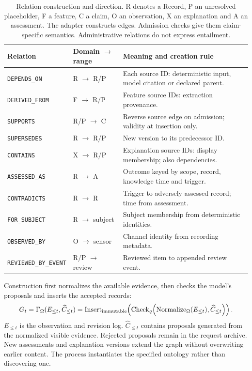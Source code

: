 \documentclass[runningheads]{llncs}
\begin{document}
\begin{table}[!htbp]
\caption{Relation construction and direction. R denotes a Record, P an unresolved
placeholder, F a feature, C a claim, O an observation, X an explanation and A an
assessment. The adapter constructs edges. Admission checks give them claim-specific
semantics. Administrative relations do not express entailment.}
\label{tab:relations}
\centering\footnotesize\setlength{\tabcolsep}{3pt}
\begin{tabularx}{\textwidth}{l l X}
\toprule Relation & Domain $\to$ range & Meaning and creation rule\\\midrule
\texttt{DEPENDS\_ON} & R $\to$ R/P & Each source ID: deterministic input, model citation or declared parent.\\
\texttt{DERIVED\_FROM} & F $\to$ R/P & Feature source IDs: extraction provenance.\\
\texttt{SUPPORTS} & R/P $\to$ C & Reverse source edge on admission; validity at insertion only.\\
\texttt{SUPERSEDES} & R $\to$ R/P & New version to its predecessor ID.\\
\texttt{CONTAINS} & X $\to$ R/P & Explanation source IDs: display membership; also dependencies.\\
\texttt{ASSESSED\_AS} & R $\to$ A & Outcome keyed by scope, record, knowledge time and trigger.\\
\texttt{CONTRADICTS} & R $\to$ R & Trigger to adversely assessed record; time from assessment.\\
\texttt{FOR\_SUBJECT} & R $\to$ subject & Subject membership from deterministic identities.\\
\texttt{OBSERVED\_BY} & O $\to$ sensor & Channel identity from recording metadata.\\
\texttt{REVIEWED\_BY\_EVENT} & R/P $\to$ review & Reviewed item to appended review event.\\
\bottomrule
\end{tabularx}
\end{table}

Construction first normalizes the available evidence, then checks the model's
proposals and inserts the accepted records:
\begin{equation}
 G_t=\Gamma_\Omega(E_{\leq t},\widehat C_{\leq t})
 =\operatorname{Insert}_{\rm immutable}\!\left(
 \operatorname{Check}_q\!\left(\operatorname{Normalize}_\Omega(E_{\leq t}),
 \widehat C_{\leq t}\right)\right).
\label{eq:construction}
\end{equation}
$E_{\leq t}$ is the observation and revision log. $\widehat C_{\leq t}$ contains
proposals generated from the normalized visible evidence. Rejected proposals
remain in the request archive. New assessments and explanation versions extend
the graph without overwriting earlier content. The process instantiates the
specified ontology rather than discovering one.
\end{document}
